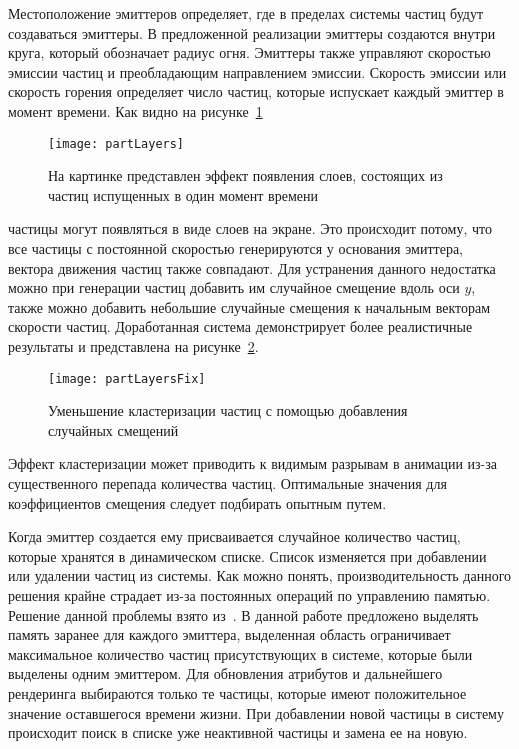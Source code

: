 Местоположение эмиттеров определяет, где в пределах системы частиц будут
создаваться эмиттеры. В предложенной реализации эмиттеры создаются внутри круга,
который обозначает радиус огня. Эмиттеры также управляют скоростью эмиссии
частиц и преобладающим направлением эмиссии. Скорость эмиссии или скорость
горения определяет число частиц, которые испускает каждый эмиттер в момент
времени. Как видно на рисунке~\ref{fig:partLayers}
\begin{figure}[htb]
	\centering
	\texttt{[image: partLayers]}
    \caption{На картинке представлен эффект появления слоев, состоящих из частиц
    испущенных в один момент времени}%
    \label{fig:partLayers}
\end{figure}
частицы могут появляться в виде слоев на экране. Это происходит потому, что все
частицы с постоянной скоростью генерируются у основания эмиттера, вектора
движения частиц также совпадают. Для устранения данного недостатка можно при
генерации частиц добавить им случайное смещение вдоль оси $y$, также можно
добавить небольшие случайные смещения к начальным векторам скорости частиц.
Доработанная система демонстрирует более реалистичные результаты и представлена
на рисунке~\ref{fig:partLayersFix}.
\begin{figure}[htb]
	\centering
	\texttt{[image: partLayersFix]}
    \caption{Уменьшение кластеризации частиц с помощью добавления случайных
    смещений}%
    \label{fig:partLayersFix}
\end{figure}
Эффект кластеризации может приводить к видимым разрывам в анимации из-за
существенного перепада количества частиц. Оптимальные значения для коэффициентов
смещения следует подбирать опытным путем.

Когда эмиттер создается ему присваивается случайное количество частиц, которые
хранятся в динамическом списке. Список изменяется при добавлении или удалении
частиц из системы. Как можно понять, производительность данного решения крайне
страдает из-за постоянных операций по управлению памятью. Решение данной
проблемы взято из~\cite{LearnOGL}. В данной работе предложено выделять память
заранее для каждого эмиттера, выделенная область ограничивает максимальное
количество частиц присутствующих в системе, которые были выделены одним
эмиттером. Для обновления атрибутов и дальнейшего рендеринга выбираются только
те частицы, которые имеют положительное значение оставшегося времени жизни. При
добавлении новой частицы в систему происходит поиск в списке уже неактивной
частицы и замена ее на новую.

